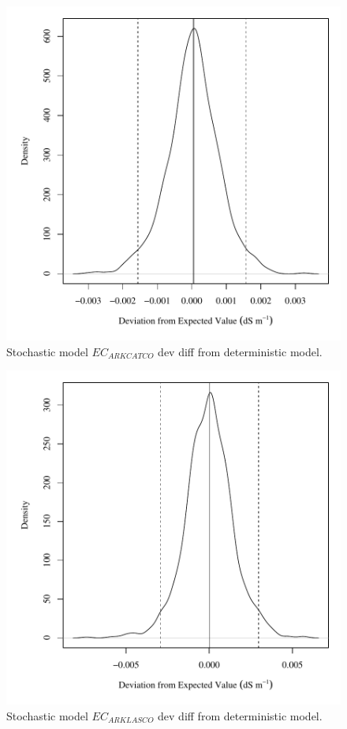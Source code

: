 \begin{center}
\begin{figure}[htbp]
	\includegraphics[width=6in]{"Figures/Results_USR/V dev diff ecin"}
	\caption{Stochastic model $EC_{ARKCATCO}$ dev diff from deterministic model.}
\end{figure}
\end{center}
\newpage

\begin{center}
\begin{figure}[htbp]
	\includegraphics[width=6in]{"Figures/Results_USR/V dev diff ecout"}
	\caption{Stochastic model $EC_{ARKLASCO}$ dev diff from deterministic model.}
\end{figure}
\end{center}
\newpage

